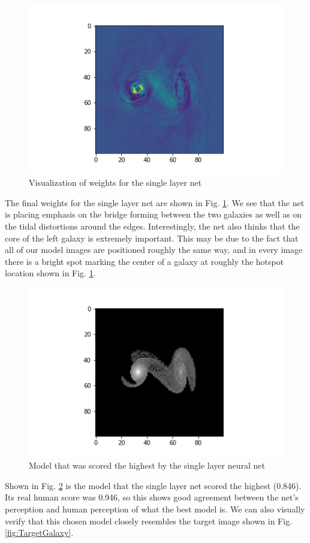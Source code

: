 \documentclass[conference]{IEEEtran}
\begin{document}
\begin{figure}[htbp]
\centerline{\includegraphics[width=0.75\linewidth]{./Images/singleWeights.png}}
\caption{Visualization of weights for the single layer net}
\label{fig:singleWeights}
\end{figure}

The final weights for the single layer net are shown in Fig. \ref{fig:singleWeights}. We see that the net is placing emphasis on the bridge forming between the two galaxies as well as on the tidal distortions around the edges. Interestingly, the net also thinks that the core of the left galaxy is extremely important. This may be due to the fact that all of our model images are positioned roughly the same way, and in every image there is a bright spot marking the center of a galaxy at roughly the hotspot location shown in Fig. \ref{fig:singleWeights}.

\begin{figure}[htbp]
\centerline{\includegraphics[width=0.75\linewidth]{./Images/SinglePredictedBest.png}}
\caption{Model that was scored the highest by the single layer neural net}
\label{fig:SinglePredictedBest}
\end{figure}


Shown in Fig. \ref{fig:SinglePredictedBest} is the model that the single layer net scored the highest (0.846). Its real human score was 0.946, so this shows good agreement between the net's perception and human perception of what the best model is. We can also visually verify that this chosen model closely resembles the target image shown in Fig. \ref{fig:TargetGalaxy}.
\end{document}
